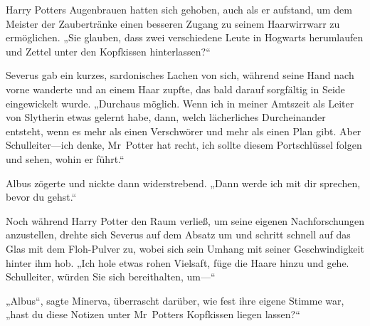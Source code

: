 Harry Potters Augenbrauen hatten sich gehoben, auch als er aufstand, um dem Meister der Zaubertränke einen besseren Zugang zu seinem Haarwirrwarr zu ermöglichen.
„Sie glauben, dass zwei verschiedene Leute in Hogwarts herumlaufen und Zettel unter den Kopfkissen hinterlassen?“

Severus gab ein kurzes, sardonisches Lachen von sich, während seine Hand nach vorne wanderte und an einem Haar zupfte, das bald darauf sorgfältig in Seide eingewickelt wurde.
„Durchaus möglich. Wenn ich in meiner Amtszeit als Leiter von Slytherin etwas gelernt habe, dann, welch lächerliches Durcheinander entsteht, wenn es mehr als einen Verschwörer und mehr als einen Plan gibt. Aber Schulleiter—ich denke, Mr~Potter hat recht, ich sollte diesem Portschlüssel folgen und sehen, wohin er führt.“

Albus zögerte und nickte dann widerstrebend. „Dann werde ich mit dir sprechen, bevor du gehst.“

\later

Noch während Harry Potter den Raum verließ, um seine eigenen Nachforschungen anzustellen, drehte sich Severus auf dem Absatz um und schritt schnell auf das Glas mit dem Floh-Pulver zu, wobei sich sein Umhang mit seiner Geschwindigkeit hinter ihm hob. „Ich hole etwas rohen Vielsaft, füge die Haare hinzu und gehe. Schulleiter, würden Sie sich bereithalten, um—“

„Albus“, sagte Minerva, überrascht darüber, wie fest ihre eigene Stimme war, „hast du diese Notizen unter Mr~Potters Kopfkissen liegen lassen?“

